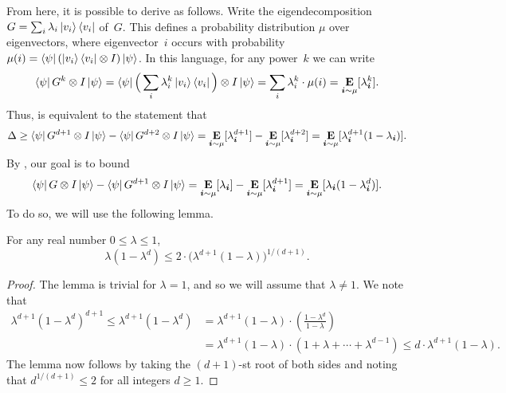 From here, it is possible to derive  as follows.
Write the eigendecomposition $G = \sum_i \lambda_i \ket{v_i}\bra{v_i}$ of~$G$.
This defines a probability distribution $\mu$ over eigenvectors, where eigenvector~$i$ occurs with probability $\mu(i) = \bra{\psi} (\ket{v_i}\bra{v_i} \otimes I) \ket{\psi}$.
In this language, for any power~$k$ we can write
\begin{equation*}
\bra{\psi} G^k \otimes I \ket{\psi}
= \bra{\psi} \Big(\sum_i \lambda_i^k \ket{v_i}\bra{v_i}\Big) \otimes I \ket{\psi}
= \sum_i \lambda_i^k \cdot \mu(i)
= \mathop{\bf E\/}_{\boldsymbol{i} \sim \mu}[\lambda_{\boldsymbol{i}}^k].
\end{equation*}
Thus,  is equivalent to the statement that
\begin{equation}\label{eq:equivalent-way-of-writing-grand-plan}
\Delta
\geq \bra{\psi} G^{d+1} \otimes I \ket{\psi} - \bra{\psi} G^{d+2} \otimes I \ket{\psi}
= \mathop{\bf E\/}_{\boldsymbol{i} \sim \mu}[\lambda_{\boldsymbol{i}}^{d+1}] - \mathop{\bf E\/}_{\boldsymbol{i} \sim \mu}[\lambda_{\boldsymbol{i}}^{d+2}]
= \mathop{\bf E\/}_{\boldsymbol{i} \sim\mu}[\lambda_{\boldsymbol{i}}^{d+1}(1-\lambda_{\boldsymbol{i}})].
\end{equation}
By , our goal is to bound
\begin{equation*}
\bra{\psi} G \otimes I \ket{\psi} - \bra{\psi} G^{d+1} \otimes I \ket{\psi}
= \mathop{\bf E\/}_{\boldsymbol{i} \sim \mu}[\lambda_{\boldsymbol{i}}] - \mathop{\bf E\/}_{\boldsymbol{i} \sim \mu}[\lambda_{\boldsymbol{i}}^{d+1}]
= \mathop{\bf E\/}_{\boldsymbol{i} \sim\mu}[\lambda_{\boldsymbol{i}}(1-\lambda_{\boldsymbol{i}}^d)].
\end{equation*}
To do so, we will use the following lemma.

\begin{lemma}\label{lem:looks-easy-but-took-me-a-while}
For any real number $0 \leq \lambda \leq 1$,
\begin{equation*}
\lambda (1-\lambda^d) \leq 2 \cdot \Big(\lambda^{d+1}(1-\lambda)\Big)^{1/(d+1)}.
\end{equation*}
\end{lemma}
\begin{proof}
The lemma is trivial for $\lambda = 1$, and so we will assume that $\lambda \neq 1$.
We note that
\begin{align*}
\lambda^{d+1} (1-\lambda^d)^{d+1}
\leq \lambda^{d+1} (1-\lambda^d)
&= \lambda^{d+1}(1-\lambda) \cdot \left(\frac{1-\lambda^d}{1-\lambda}\right)\\
&= \lambda^{d+1}(1-\lambda) \cdot (1 + \lambda + \cdots + \lambda^{d-1})
\leq d \cdot \lambda^{d+1}(1-\lambda).
\end{align*}
The lemma now follows by taking the $(d+1)$-st root of both sides and noting that $d^{1/(d+1)} \leq 2$ for all integers $d \geq 1$.
\end{proof}

